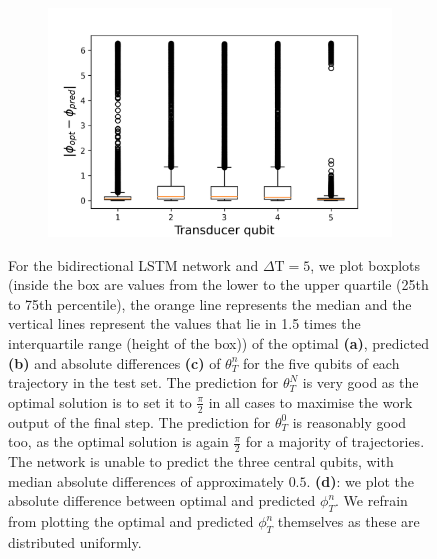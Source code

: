\begin{figure}[h]
\begin{subfigure}{0.45\textwidth}
	\end{subfigure}
\begin{subfigure}{0.45\textwidth}
	\centering
	\includegraphics[width=\textwidth]{img/delta_phi_box2}
\end{subfigure}
\caption{For the bidirectional LSTM network and $\Delta \mathrm{T} = 5$, we plot boxplots (inside the box are values from the lower to the upper quartile (25th to 75th percentile), the orange line represents the median and the vertical lines represent the values that lie in 1.5 times the interquartile range (height of the box)) of the optimal \textbf{(a)}, predicted \textbf{(b)} and absolute differences \textbf{(c)} of $\theta^n_T$ for the five qubits of each trajectory in the test set. The prediction for $\theta_T^N$ is very good as the optimal solution is to set it to $\frac{\pi}{2}$ in all cases to maximise the work output of the final step. The prediction for $\theta_T^0$ is reasonably good too, as the optimal solution is again $\frac{\pi}{2}$ for a majority of trajectories. The network is unable to predict the three central qubits, with median absolute differences of approximately $0.5$. \textbf{(d)}: we plot the absolute difference between optimal and predicted $\phi_T^n$. We refrain from plotting the optimal and predicted $\phi_T^n$ themselves as these are distributed uniformly.}
\label{bilstmbox}
\end{figure}

\newpage